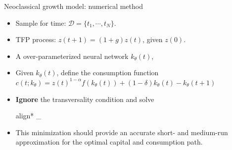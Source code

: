 \documentclass[aspectratio=169,10pt]{beamer}
\newcommand{\emphcolor}[1]{\textbf{\textcolor{emphcolorval}{#1}}}
\begin{document}
\begin{frame}{Neoclassical growth model: numerical method}
	\begin{itemize}
		\item Sample for time:  $\mathcal{D} = \{t_1,\cdots,t_N\}$.
		\vspace{0.05in}
		\item TFP process: $z(t+1) = (1+g)z(t)$, given $z(0)$.
		\item A over-parameterized neural network $k_\theta(t)$,
		\vspace{0.05in}
		\item Given $k_\theta(t)$, define the consumption function $c(t;k_{\theta}) = z(t)^{1-\alpha}f(k_{\theta}(t)) +(1-\delta)k_{\theta}(t)-k_{\theta}(t+1)
		$
		\vspace{0.05in}
		 \item \emphcolor{Ignore} the transversality condition and solve 
		\begin{empheq}[box=\tcbhighmath]{align*}
			\min_{\theta \in \Theta}
		\end{empheq}
		\item This minimization should provide an accurate short- and medium-run approximation for the optimal capital and consumption path.
	\end{itemize}
\end{frame}
\end{document}
